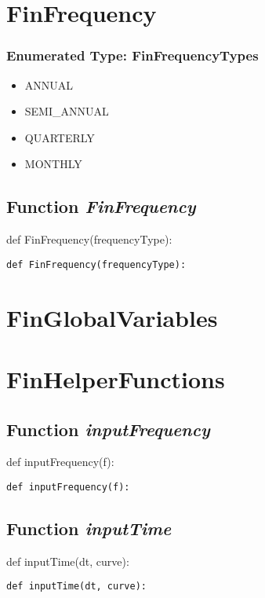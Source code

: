 \documentclass[twoside,11pt]{book}
\begin{document}
\newpage
\section{FinFrequency}

\subsubsection{Enumerated Type: FinFrequencyTypes}
\begin{itemize}
\item{ANNUAL}
\item{SEMI\_ANNUAL}
\item{QUARTERLY}
\item{MONTHLY}
\end{itemize}

\subsection{Function {\it FinFrequency}}
def FinFrequency(frequencyType):

\begin{lstlisting}
def FinFrequency(frequencyType):
\end{lstlisting}

\newpage
\section{FinGlobalVariables}

\newpage
\section{FinHelperFunctions}

\subsection{Function {\it inputFrequency}}
def inputFrequency(f):

\begin{lstlisting}
def inputFrequency(f):
\end{lstlisting}

\subsection{Function {\it inputTime}}
def inputTime(dt, curve):

\begin{lstlisting}
def inputTime(dt, curve):
\end{lstlisting}
\end{document}
